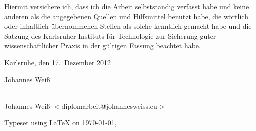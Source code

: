 \cleardoublepage{}

\setcounter{page}{1}

\vspace*{\fill}


\bigskip{}

\noindent{}Hiermit versichere ich, dass ich die Arbeit selbstst\"andig verfasst
habe und keine anderen als die angegebenen Quellen und Hilfsmittel benutzt habe,
die w\"ortlich oder inhaltlich \"ubernommenen Stellen als solche kenntlich
gemacht habe und die Satzung des Karlsruher Instituts f\"ur Technologie zur
Sicherung guter wissenschaftlicher Praxis in der g\"ultigen Fassung beachtet
habe.

\bigskip{}

Karlsruhe, den 17.\ Dezember 2012

\bigskip{}

\bigskip{}

\bigskip{}

Johannes Wei\ss

\vspace*{\fill}

\cleardoublepage

\vspace*{\fill}
\begin{center}
{\Large \JWtitle{}} \\
Johannes Wei\ss{} $<$diplomarbeit@johannesweiss.eu$>$
\end{center}
\vspace*{\fill}

\newpage

\null
\vfill
\hfill Typeset using \LaTeX{} on \today{}, \currenttime{}.


